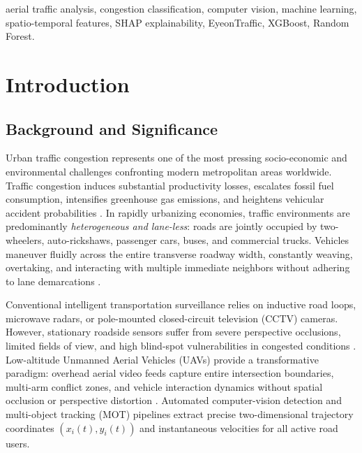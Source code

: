 \documentclass[conference]{IEEEtran}
\begin{document}
\begin{IEEEkeywords}
aerial traffic analysis, congestion classification, computer vision, machine learning, spatio-temporal features, SHAP explainability, EyeonTraffic, XGBoost, Random Forest.
\end{IEEEkeywords}

\section{Introduction}

\subsection{Background and Significance}
Urban traffic congestion represents one of the most pressing socio-economic and environmental challenges confronting modern metropolitan areas worldwide. Traffic congestion induces substantial productivity losses, escalates fossil fuel consumption, intensifies greenhouse gas emissions, and heightens vehicular accident probabilities \cite{impedovo2019vehicular}. In rapidly urbanizing economies, traffic environments are predominantly \textit{heterogeneous and lane-less}: roads are jointly occupied by two-wheelers, auto-rickshaws, passenger cars, buses, and commercial trucks. Vehicles maneuver fluidly across the entire transverse roadway width, constantly weaving, overtaking, and interacting with multiple immediate neighbors without adhering to lane demarcations \cite{roy2020defining}.

Conventional intelligent transportation surveillance relies on inductive road loops, microwave radars, or pole-mounted closed-circuit television (CCTV) cameras. However, stationary roadside sensors suffer from severe perspective occlusions, limited fields of view, and high blind-spot vulnerabilities in congested conditions \cite{impedovo2019vehicular}. Low-altitude Unmanned Aerial Vehicles (UAVs) provide a transformative paradigm: overhead aerial video feeds capture entire intersection boundaries, multi-arm conflict zones, and vehicle interaction dynamics without spatial occlusion or perspective distortion \cite{roy2022detection, kumar2024tsanet}. Automated computer-vision detection and multi-object tracking (MOT) pipelines \cite{redmon2016you, zhang2022bytetrack} extract precise two-dimensional trajectory coordinates $(x_i(t), y_i(t))$ and instantaneous velocities for all active road users.
\end{document}
